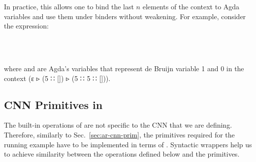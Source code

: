 In practice, this allows one to bind the last $n$ elements of the
context to Agda variables and use them under binders without weakening.
For example, consider the expression:
\begin{code}%
%
\>[2]\AgdaFunction{\AgdaUnderscore{}}\AgdaSpace{}%
\AgdaSymbol{:}\AgdaSpace{}%
\AgdaSpace{}%
\AgdaSymbol{\AgdaUnderscore{}}\AgdaSpace{}%
\AgdaSymbol{\AgdaUnderscore{}}\<%
\\
%
\>[2]\AgdaSymbol{\AgdaUnderscore{}}\AgdaSpace{}%
\AgdaSymbol{=}%
\>[2004I]\AgdaSpace{}%
\AgdaSymbol{(}\AgdaSpace{}%
\AgdaSymbol{(}\AgdaSpace{}%
\AgdaSymbol{)}\AgdaSpace{}%
\AgdaSpace{}%
\AgdaSpace{}%
\AgdaSymbol{(}\AgdaSpace{}%
\AgdaSpace{}%
\AgdaSpace{}%
\AgdaSpace{}%
\AgdaInductiveConstructor{[]}\AgdaSymbol{)}\AgdaSpace{}%
\AgdaSpace{}%
\AgdaInductiveConstructor{[]}\AgdaSymbol{)}\AgdaSpace{}%
\AgdaSymbol{(}\AgdaSpace{}%
\AgdaInductiveConstructor{[]}\AgdaSymbol{)}\AgdaSpace{}%
\<%
\\
\>[.][@{}l@{}]\<[2004I]%
\>[6]\AgdaSpace{}%
\AgdaSpace{}%
\AgdaSpace{}%
\AgdaSpace{}%
\AgdaSpace{}%
\AgdaSpace{}%
\AgdaSpace{}%
\AgdaSpace{}%
\AgdaSpace{}%
\AgdaSpace{}%
\AgdaSpace{}%
\AgdaSpace{}%
\AgdaSpace{}%
\AgdaSymbol{(}\AgdaSpace{}%
\AgdaSpace{}%
\AgdaSymbol{)}\AgdaSpace{}%
\<%
\end{code}
where  and  are Agda's variables that represent
de Bruijn variable 1 and 0{} in the context (ε ▹  (5 ∷ []) ▹ 
 (5 ∷ 5 ∷ [])).



\subsection{CNN Primitives in }
The built-in operations of  are not specific to the CNN that we
are defining.  Therefore, similarly to Sec.~\ref{sec:ar-cnn-prim},
the primitives required for the running example have to be
implemented in terms of .  Syntactic wrappers help us
to achieve similarity between the operations defined below and the
 primitives.


